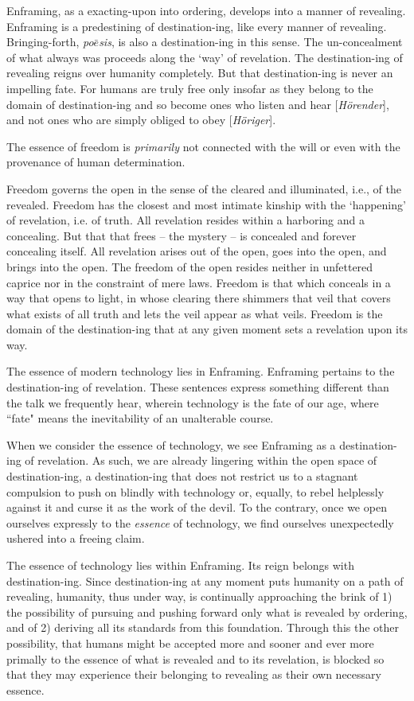 \documentclass[paper=a4, fontsize=11pt,twoside]{scrartcl}
\begin{document}
Enframing, as a exacting-upon into ordering, develops into a manner of revealing. Enframing is a predestining of destination-ing, like every manner of revealing. Bringing-forth, \textit{po$\bar{e}$sis}, is also a destination-ing in this sense. The un-concealment of what always was proceeds along the `way' of revelation. The destination-ing of revealing reigns over humanity completely. But that destination-ing is never an impelling fate. For humans are truly free only insofar as they belong to the domain of destination-ing and so become ones who listen and hear [\textit{H{\"o}render}], and not ones who are simply obliged to obey [\textit{H{\"o}riger}].

The essence of freedom is \textit{primarily} not connected with the will or even with the provenance of human determination.

Freedom governs the open in the sense of the cleared and illuminated, i.e., of the revealed. Freedom has the closest and most intimate kinship with the `happening' of revelation, i.e. of truth. All revelation resides within a harboring and a concealing. But that that frees -- the mystery -- is concealed and forever concealing itself. All revelation arises out of the open, goes into the open, and brings into the open. The freedom of the open resides neither in unfettered caprice nor in the constraint of mere laws. Freedom is that which conceals in a way that opens to light, in whose clearing there shimmers that veil that covers what exists of all truth and lets the veil appear as what veils. Freedom is the domain of the destination-ing that at any given moment sets a revelation upon its way.

The essence of modern technology lies in Enframing. Enframing pertains to the destination-ing of revelation. These sentences express something different than the talk we frequently hear, wherein technology is the fate of our age, where ``fate" means the inevitability of an unalterable course.

When we consider the essence of technology, we see Enframing as a destination-ing of revelation. As such, we are already lingering within the open space of destination-ing, a destination-ing that does not restrict us to a stagnant compulsion to push on blindly with technology or, equally, to rebel helplessly against it and curse it as the work of the devil. To the contrary, once we open ourselves expressly to the \textit{essence} of technology, we find ourselves unexpectedly ushered into a freeing claim.

The essence of technology lies within Enframing. Its reign belongs with destination-ing. Since destination-ing at any moment puts humanity on a path of revealing, humanity, thus under way, is continually approaching the brink of 1) the possibility of pursuing and pushing forward only what is revealed by ordering, and of 2) deriving all its standards from this foundation. Through this the other possibility, that humans might be accepted more and sooner and ever more primally to the essence of what is revealed and to its revelation, is blocked so that they may experience their belonging to revealing as their own necessary essence.
\end{document}
